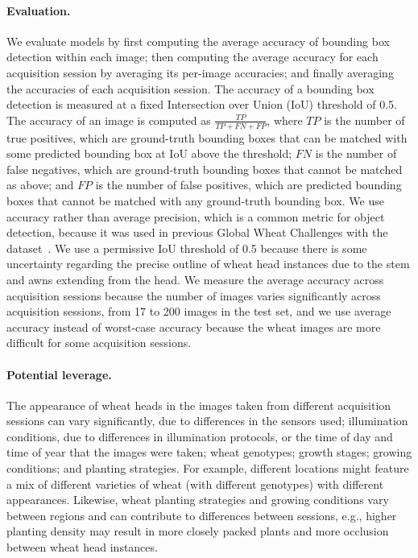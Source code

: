 \paragraph{Evaluation.}
We evaluate models by first computing the average accuracy of bounding box detection within each image;
then computing the average accuracy for each acquisition session by averaging its per-image accuracies;
and finally averaging the accuracies of each acquisition session.
The accuracy of a bounding box detection is measured at a fixed Intersection over Union (IoU) threshold of 0.5.
The accuracy of an image is computed as $\frac{TP}{TP + FN + FP}$, where
$TP$ is the number of true positives, which are ground-truth bounding boxes that can be matched with some predicted bounding box at IoU above the threshold;
$FN$ is the number of false negatives, which are ground-truth bounding boxes that cannot be matched as above; and
$FP$ is the number of false positives, which are predicted bounding boxes that cannot be matched with any ground-truth bounding box.
We use accuracy rather than average precision, which is a common metric for object detection, because it was used in previous Global Wheat Challenges with the dataset~\citep{david2020global,david2021global}. We use a permissive IoU threshold of 0.5 because there is some uncertainty regarding the precise outline of wheat head instances due to the stem and awns extending from the head.
We measure the average accuracy across acquisition sessions because the number of images varies significantly across acquisition sessions, from 17 to 200 images in the test set, and we use average accuracy instead of worst-case accuracy because the wheat images are more difficult for some acquisition sessions.

\paragraph{Potential leverage.}
The appearance of wheat heads in the images taken from different acquisition sessions can vary significantly, due to differences in the sensors used; illumination conditions, due to differences in illumination protocols, or the time of day and time of year that the images were taken; wheat genotypes; growth stages; growing conditions; and planting strategies.
For example, different locations might feature a mix of different varieties of wheat (with different genotypes) with different appearances. Likewise, wheat planting strategies and growing conditions vary between regions and can contribute to differences between sessions, e.g., higher planting density may result in more closely packed plants and more occlusion between wheat head instances.

